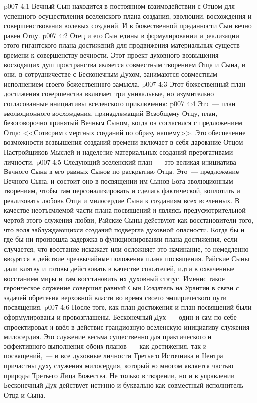 \vs p007 4:1 Вечный Сын находится в постоянном взаимодействии с Отцом для успешного осуществления  вселенского плана создания, эволюции, восхождения и совершенствования волевых созданий. И в божественной преданности Сын вечно равен Отцу.
\vs p007 4:2 Отец и его Сын едины в формулировании и реализации этого гигантского плана достижений для продвижения материальных существ времени к совершенству вечности. Этот проект духовного возвышения восходящих душ пространства является совместным творением Отца и Сына, и они, в сотрудничестве с Бесконечным Духом, занимаются совместным исполнением своего божественного замысла.
\vs p007 4:3 \pc Этот божественный план достижения совершенства включает три уникальные, но изумительно согласованные инициативы вселенского приключения:
\vs p007 4:4  Это~--- план эволюционного восхождения, принадлежащий Всеобщему Отцу, план, безоговорочно принятый Вечным Сыном, когда он согласился с предложением Отца: <<Сотворим смертных созданий по образу нашему>>. Это обеспечение возможности возвышения созданий времени включает в себя дарование Отцом Настройщиков Мыслей и наделение материальных созданий прерогативами личности.
\vs p007 4:5  Следующий вселенский план~--- это великая инициатива Вечного Сына и его равных Сынов по раскрытию Отца. Это~--- предложение Вечного Сына, и состоит оно в посвящении им Сынов Бога эволюционным творениям, чтобы там персонализировать и сделать фактической, воплотить и реализовать любовь Отца и милосердие Сына к созданиям всех вселенных. В качестве неотъемлемой части плана посвящений и являясь предусмотрительной чертой этого служения любви, Райские Сыны действуют как восстановители того, что воля заблуждающихся созданий подвергла духовной опасности. Когда бы и где бы ни произошла задержка в функционировании плана достижения, если случается, что восстание искажает или осложняет это начинание, то немедленно вводятся в действие чрезвычайные положения плана посвящения. Райские Сыны дали клятву и готовы действовать в качестве спасателей, идти в охваченные восстанием миры и там восстановить их духовный статус. Именно такое героическое служение совершил равный Сын Создатель на Урантии в связи с задачей обретения верховной власти во время своего эмпирического пути посвящения.
\vs p007 4:6  После того, как план достижения и план посвящений были сформулированы и провозглашены, Бесконечный Дух~--- один и сам по себе~--- спроектировал и ввёл в действие грандиозную вселенскую инициативу служения милосердия. Это служение весьма существенно для практического и эффективного выполнения обоих планов~--- как достижения, так и посвящений,~--- и все духовные личности Третьего Источника и Центра причастны духу служения милосердия, который во многом является частью природы Третьего Лица Божества. Не только в творении, но и в управлении Бесконечный Дух действует истинно и буквально как совместный исполнитель Отца и Сына.
